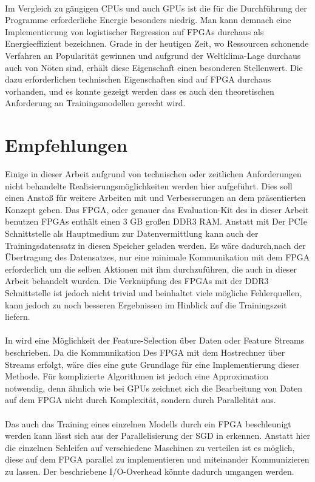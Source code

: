 \\Im Vergleich zu gängigen CPUs und auch GPUs ist die für die Durchführung der Programme erforderliche Energie besonders niedrig. Man kann demnach eine Implementierung von logistischer Regression auf FPGAs durchaus als Energieeffizient bezeichnen. Grade in der heutigen Zeit, wo Ressourcen schonende Verfahren an Popularität gewinnen und aufgrund der Weltklima-Lage durchaus auch von Nöten sind, erhält diese Eigenschaft einen besonderen Stellenwert. Die dazu erforderlichen technischen Eigenschaften sind auf FPGA durchaus vorhanden, und es konnte gezeigt werden dass es auch den theoretischen Anforderung an Trainingsmodellen gerecht wird.

\section{Empfehlungen}
Einige in dieser Arbeit aufgrund von technischen oder zeitlichen Anforderungen nicht behandelte Realisierungsmöglichkeiten werden hier aufgeführt. Dies soll einen Anstoß für weitere Arbeiten mit und Verbesserungen an dem präsentierten Konzept geben. Das FPGA, oder genauer das Evaluation-Kit des in dieser Arbeit benutzen FPGAs enthält einen 3 GB großen DDR3 RAM. Anstatt mit Der PCIe Schnittstelle als Hauptmedium zur Datenvermittlung kann auch der Trainingsdatensatz in diesen Speicher geladen werden. Es wäre dadurch,nach der Übertragung des Datensatzes, nur eine minimale Kommunikation mit dem FPGA erforderlich um die selben Aktionen mit ihm durchzuführen, die auch in dieser Arbeit behandelt wurden. Die Verknüpfung des FPGAs mit der DDR3 Schnittstelle ist jedoch nicht trivial und beinhaltet viele mögliche Fehlerquellen, kann jedoch zu noch besseren Ergebnissen im Hinblick auf die Trainingszeit liefern.\\\\
In \cite{FS} wird eine Möglichkeit der Feature-Selection über Daten oder Feature Streams beschrieben. Da die Kommunikation Des FPGA mit dem Hostrechner über Streams erfolgt, wäre dies eine gute Grundlage für eine Implementierung dieser Methode. Für komplizierte Algorithmen ist jedoch eine Approximation notwendig, denn ähnlich wie bei GPUs zeichnet sich die Bearbeitung von Daten auf dem FPGA nicht durch Komplexität, sondern durch Parallelität aus.\\\\
Das auch das Training eines einzelnen Modells durch ein FPGA beschleunigt werden kann lässt sich aus der Parallelisierung der SGD in \cite{ZINKE} erkennen. Anstatt hier die einzelnen Schleifen auf verschiedene Maschinen zu verteilen ist es möglich, diese auf dem FPGA parallel zu implementieren und miteinander Kommunizieren zu lassen. Der beschriebene I/O-Overhead könnte dadurch umgangen werden.\\\\
